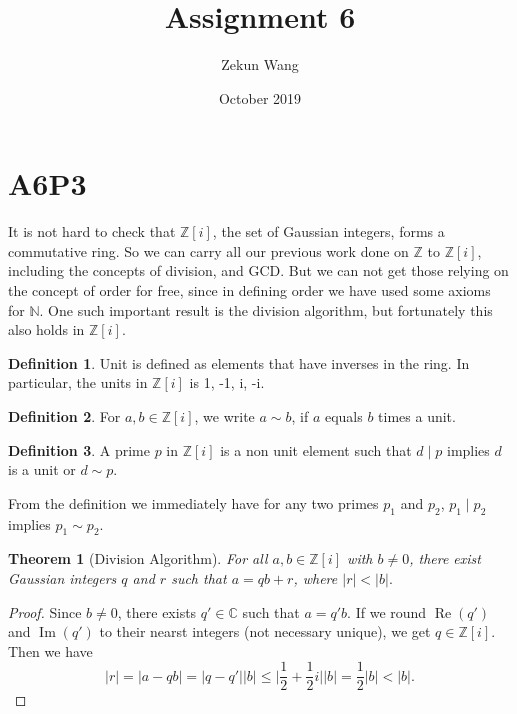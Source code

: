 \documentclass{article}
\title{Assignment 6}
\author{Zekun Wang}
\date{October 2019}
\begin{document}
\newtheorem{theorem}{Theorem}[section]

\newtheorem{lemma}[theorem]{Lemma}
\newtheorem{conjecture}[theorem]{Conjecture}
\newtheorem{corollary}{Corollary}[theorem]

\theoremstyle{definition}
\newtheorem{definition}{Definition}[section]
\newtheorem{example}{Example}[theorem]

\maketitle

\section{A6P3}
It is not hard to check that $\mathbb{Z}[i]$, the set of Gaussian integers, forms a commutative ring. So we can carry all our previous work done on $\mathbb{Z}$ to $\mathbb{Z}[i]$, including the concepts of division, and GCD.  But we can not get those relying on the concept of order for free, since in defining order we have used some axioms for $\mathbb{N}$. One such important result is the division algorithm, but fortunately this also holds in $\mathbb{Z}[i]$.

\begin{definition}
Unit is defined as elements that have inverses in the ring. In particular, the units in $\mathbb{Z}[i]$ is 1, -1, i, -i.
\end{definition}

\begin{definition}
For $a,b \in \mathbb{Z}[i]$, we write $a \sim b$, if $a$ equals $b$ times a unit.
\end{definition}
\begin{definition}
A prime $p$ in $\mathbb{Z}[i]$ is a non unit element such that $d\mid p$ implies $d$ is a unit or $d \sim p$.
\end{definition}
From the definition we immediately have for any two primes $p_1$ and $p_2$, $p_1 \mid p_2$ implies $p_1 \sim p_2$.
\begin{theorem}[Division Algorithm]
For all $a,b \in \mathbb{Z}[i]$ with $b \not = 0$, there exist Gaussian integers $q$ and $r$ such that $a = qb+r$, where $\vert r \vert < \vert b \vert.$
\end{theorem}

\begin{proof}
Since $b \not = 0$, there exists $q' \in \mathbb{C}$ such that $a = q'b$. If we round $\operatorname{Re}(q')$ and $\operatorname{Im}(q')$ to their nearst integers (not necessary unique), we get $q \in \mathbb{Z}[i]$. Then we have 
$$\vert r \vert = \vert a - qb \vert  = \vert q - q' \vert \vert b \vert \leq \vert \frac{1}{2}+\frac{1}{2}i\vert\vert b\vert = \frac{1}{2}\vert b \vert < \vert b \vert.$$
\end{proof}
\end{document}
